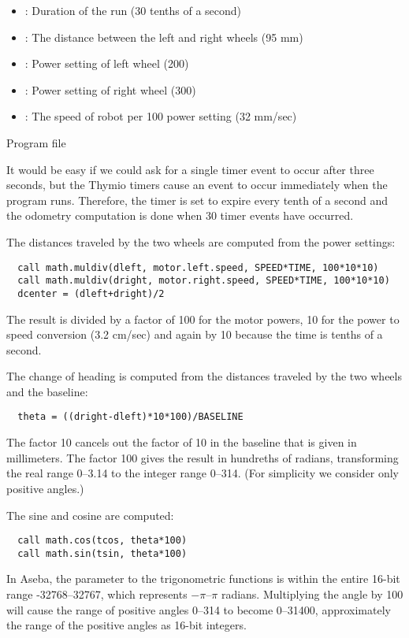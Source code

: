 
\begin{itemize}
\item {}: Duration of the run (30 tenths of a second)
\item {}: The distance between the left and right wheels (95 mm)
\item {}: Power setting of left wheel (200)
\item {}: Power setting of right wheel (300)
\item {}: The speed of robot per 100 power setting (32 mm/sec)
\end{itemize}


{\raggedleft \hfill Program file }

It would be easy if we could ask for a single timer event to occur
after three seconds, but the Thymio timers cause an event to occur
immediately when the program runs.
Therefore, the timer is set to expire every tenth of a second and the
odometry computation is done when 30 timer events have occurred.

The distances traveled by the two wheels are computed from the power settings:
\begin{verbatim}
  call math.muldiv(dleft, motor.left.speed, SPEED*TIME, 100*10*10)
  call math.muldiv(dright, motor.right.speed, SPEED*TIME, 100*10*10)
  dcenter = (dleft+dright)/2
\end{verbatim}
The result is divided by a factor of 100 for the motor powers,
10 for the power to speed conversion (3.2 cm/sec) and again by 10
because the time is tenths of a second.

The change of heading is computed from the distances traveled by the two wheels
and the baseline:
\begin{verbatim}
  theta = ((dright-dleft)*10*100)/BASELINE
\end{verbatim}
The factor 10 cancels out the factor of 10 in the baseline that
is given in millimeters.
The factor 100 gives the result in hundreths of radians,
transforming the real range 0--3.14 to the integer range 0--314.
(For simplicity we consider only positive angles.)

The sine and cosine are computed:
\begin{verbatim}
  call math.cos(tcos, theta*100)
  call math.sin(tsin, theta*100)
\end{verbatim}
In Aseba, the parameter to the trigonometric functions is within
the entire 16-bit range -32768--32767, which represents
$-\pi$--$\pi$ radians.
Multiplying the angle by 100 will cause the range of positive
angles 0--314 to become 0--31400, approximately the range
of the positive angles as 16-bit integers.

